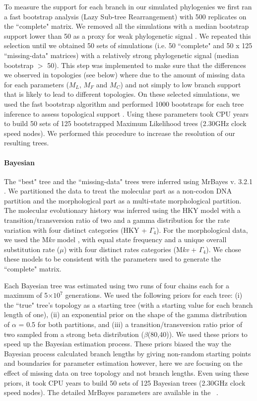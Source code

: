 \documentclass[10pt,letterpaper]{article}
\begin{document}
To measure the support for each branch in our simulated phylogenies we first ran a fast bootstrap analysis (Lazy Sub-tree Rearrangement) with 500 replicates on the ``complete" matrix. We removed all the simulations with a median bootstrap support lower than 50 as a proxy for weak phylogenetic signal \cite{zanderminimal2004}. We repeated this selection until we obtained 50 sets of simulations (i.e. 50 ``complete" and 50 x 125 ``missing-data" matrices) with a relatively strong phylogenetic signal (median bootstrap $>$ 50). This step was implemented to make sure that the differences we observed in topologies (see below) where due to the amount of missing data for each parameters ($M_L$, $M_F$ and $M_C$) and not simply to low branch support that is likely to lead to different topologies. On these selected simulations, we used the fast bootstrap algorithm and performed 1000 bootstraps for each tree inference to assess topological support \cite{pattengale2010many}. Using these parameters took  CPU years to build 50 sets of 125 bootstrapped Maximum Likelihood trees (2.30GHz clock speed nodes). We performed this procedure to increase the resolution of our resulting trees. 

\paragraph*{Bayesian}
The ``best" tree and the ``missing-data" trees were inferred using MrBayes v. 3.2.1 \cite{Ronquist2012mrbayes}. We partitioned the data to treat the molecular part as a non-codon DNA partition and the morphological part as a multi-state morphological partition. The molecular evolutionary history was inferred using the HKY model with a transition/transversion ratio of two \cite{douadycomparison2003} and a gamma distribution for the rate variation with four distinct categories (HKY + $\Gamma_4$). For the morphological data, we used the M\textit{kv} model \cite{lewisa2001}, with equal state frequency and a unique overall substitution rate ($\mu$) with four distinct rates categories (M\textit{kv} + $\Gamma_4$). We chose these models to be consistent with the parameters used to generate the ``complete" matrix.

Each Bayesian tree was estimated using two runs of four chains each for a maximum of 5$\times$$10^7$ generations. We used the following priors for each tree: (i) the ``true" tree’s topology as a starting tree (with a starting value for each branch length of one), (ii) an exponential prior on the shape of the gamma distribution of $\alpha$ = 0.5 for both partitions, and (iii) a transition/transversion ratio prior of two sampled from a strong beta distribution ($\beta$(80,40)). We used these priors to speed up the Bayesian estimation process. These priors biased the way the Bayesian process calculated branch lengths by giving non-random starting points and boundaries for parameter estimation however, here we are focusing on the effect of missing data on tree topology and not branch lengths. Even using these priors, it took  CPU years to build 50 sets of 125 Bayesian trees (2.30GHz clock speed nodes). The detailed MrBayes parameters are available in the ~.
\end{document}
